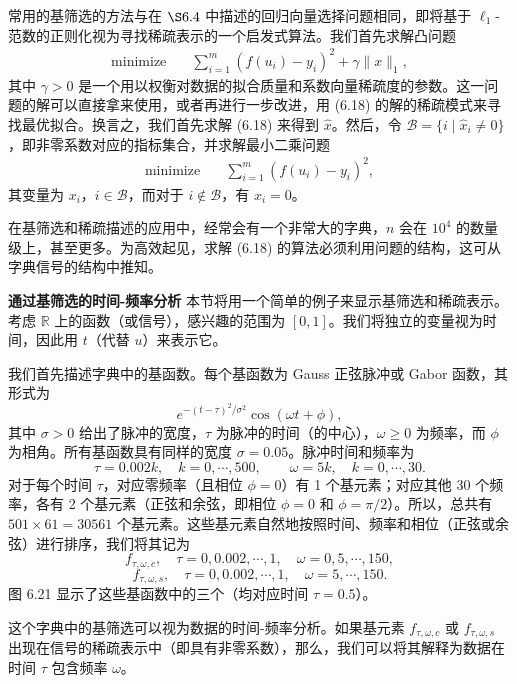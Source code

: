 \documentclass[UTF8, 12pt, fontset=fandol, oneside]{ctexart}
\begin{document}
常用的基筛选的方法与在 $\S 6.4$ 中描述的回归向量选择问题相同，即将基于 $\ell_1$-范数的正则化视为寻找稀疏表示的一个启发式算法。我们首先求解凸问题
\begin{equation}
\begin{aligned}
\text{minimize}\quad & \sum_{i=1}^m(f(u_i)-y_i)^2+\gamma\|x\|_1,
\end{aligned}
\tag{6.18}
\end{equation}
其中 $\gamma>0$ 是一个用以权衡对数据的拟合质量和系数向量稀疏度的参数。这一问题的解可以直接拿来使用，或者再进行一步改进，用 (6.18) 的解的稀疏模式来寻找最优拟合。换言之，我们首先求解 (6.18) 来得到 $\hat{x}$。然后，令 $\mathcal{B}=\{i\mid \hat{x}_i\neq 0\}$，即非零系数对应的指标集合，并求解最小二乘问题
\[
\begin{aligned}
\text{minimize}\quad & \sum_{i=1}^m(f(u_i)-y_i)^2,
\end{aligned}
\]
其变量为 $x_i$，$i\in\mathcal{B}$，而对于 $i\notin\mathcal{B}$，有 $x_i=0$。

在基筛选和稀疏描述的应用中，经常会有一个非常大的字典，$n$ 会在 $10^4$ 的数量级上，甚至更多。为高效起见，求解 (6.18) 的算法必须利用问题的结构，这可从字典信号的结构中推知。

\noindent\textbf{通过基筛选的时间-频率分析}\quad
本节将用一个简单的例子来显示基筛选和稀疏表示。考虑 $\mathbb{R}$ 上的函数（或信号），感兴趣的范围为 $[0,1]$。我们将独立的变量视为时间，因此用 $t$（代替 $u$）来表示它。

我们首先描述字典中的基函数。每个基函数为 Gauss 正弦脉冲或 Gabor 函数，其形式为
\[
e^{-(t-\tau)^2/\sigma^2}\cos(\omega t+\phi),
\]
其中 $\sigma>0$ 给出了脉冲的宽度，$\tau$ 为脉冲的时间（的中心），$\omega\geq 0$ 为频率，而 $\phi$ 为相角。所有基函数具有同样的宽度 $\sigma=0.05$。脉冲时间和频率为
\[
\tau=0.002k,\quad k=0,\cdots,500,\qquad \omega=5k,\quad k=0,\cdots,30.
\]
对于每个时间 $\tau$，对应零频率（且相位 $\phi=0$）有 1 个基元素；对应其他 30 个频率，各有 2 个基元素（正弦和余弦，即相位 $\phi=0$ 和 $\phi=\pi/2$）。所以，总共有 $501\times 61=30561$ 个基元素。这些基元素自然地按照时间、频率和相位（正弦或余弦）进行排序，我们将其记为
\[
f_{\tau,\omega,c},\quad \tau=0,0.002,\cdots,1,\quad \omega=0,5,\cdots,150,
\]
\[
f_{\tau,\omega,s},\quad \tau=0,0.002,\cdots,1,\quad \omega=5,\cdots,150.
\]
图 6.21 显示了这些基函数中的三个（均对应时间 $\tau=0.5$）。

这个字典中的基筛选可以视为数据的时间-频率分析。如果基元素 $f_{\tau,\omega,c}$ 或 $f_{\tau,\omega,s}$ 出现在信号的稀疏表示中（即具有非零系数），那么，我们可以将其解释为数据在时间 $\tau$ 包含频率 $\omega$。
\end{document}
